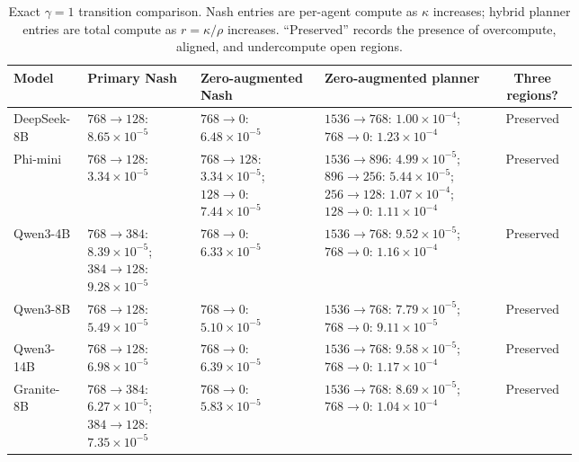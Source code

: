 \begin{table}[H]
\centering
\caption{Exact $\gamma=1$ transition comparison. Nash entries are per-agent compute as $\kappa$ increases; hybrid planner entries are total compute as $r=\kappa/\rho$ increases. ``Preserved'' records the presence of overcompute, aligned, and undercompute open regions.}
\label{tab:zeroaugmented}
\scriptsize
\setlength{\tabcolsep}{3pt}
\renewcommand{\arraystretch}{1.12}
\begin{tabular}{@{}lp{0.20\linewidth}p{0.22\linewidth}p{0.31\linewidth}c@{}}
\toprule
Model & Primary Nash & Zero-augmented Nash & Zero-augmented planner & Three regions? \\
\midrule
DeepSeek-8B & $768\to128$: $8.65\!\times\!10^{-5}$ & $768\to0$: $6.48\!\times\!10^{-5}$ & $1536\to768$: $1.00\!\times\!10^{-4}$; $768\to0$: $1.23\!\times\!10^{-4}$ & Preserved \\
Phi-mini & $768\to128$: $3.34\!\times\!10^{-5}$ & $768\to128$: $3.34\!\times\!10^{-5}$; $128\to0$: $7.44\!\times\!10^{-5}$ & $1536\to896$: $4.99\!\times\!10^{-5}$; $896\to256$: $5.44\!\times\!10^{-5}$; $256\to128$: $1.07\!\times\!10^{-4}$; $128\to0$: $1.11\!\times\!10^{-4}$ & Preserved \\
Qwen3-4B & $768\to384$: $8.39\!\times\!10^{-5}$; $384\to128$: $9.28\!\times\!10^{-5}$ & $768\to0$: $6.33\!\times\!10^{-5}$ & $1536\to768$: $9.52\!\times\!10^{-5}$; $768\to0$: $1.16\!\times\!10^{-4}$ & Preserved \\
Qwen3-8B & $768\to128$: $5.49\!\times\!10^{-5}$ & $768\to0$: $5.10\!\times\!10^{-5}$ & $1536\to768$: $7.79\!\times\!10^{-5}$; $768\to0$: $9.11\!\times\!10^{-5}$ & Preserved \\
Qwen3-14B & $768\to128$: $6.98\!\times\!10^{-5}$ & $768\to0$: $6.39\!\times\!10^{-5}$ & $1536\to768$: $9.58\!\times\!10^{-5}$; $768\to0$: $1.17\!\times\!10^{-4}$ & Preserved \\
Granite-8B & $768\to384$: $6.27\!\times\!10^{-5}$; $384\to128$: $7.35\!\times\!10^{-5}$ & $768\to0$: $5.83\!\times\!10^{-5}$ & $1536\to768$: $8.69\!\times\!10^{-5}$; $768\to0$: $1.04\!\times\!10^{-4}$ & Preserved \\
\bottomrule
\end{tabular}%
\end{table}
